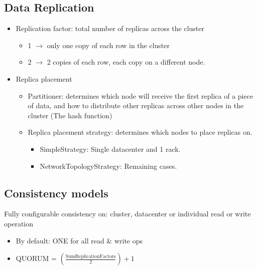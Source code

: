 \subsection{Data Replication}
\begin{itemize}
  \item Replication factor: total number of replicas across the cluster
  \begin{itemize}
    \item 1 $\rightarrow$ only one copy of each row in the cluster
    \item 2 $\rightarrow$ 2 copies of each row, each copy on a different node.
  \end{itemize}
  \item Replica placement
  \begin{itemize}
    \item Partitioner: determines which node will receive the first replica of a piece of data, and how to distribute other replicas across other nodes in the cluster (The hash function)
    \item Replica placement strategy: determines which nodes to place replicas on.
    \begin{itemize}
      \item SimpleStrategy: Single datacenter and 1 rack.
      \item NetworkTopologyStrategy: Remaining cases.
    \end{itemize}
  \end{itemize}
\end{itemize}
\subsection{Consistency models}
 Fully configurable consistency on: cluster, datacenter or individual read or write operation
\begin{itemize}
  \item By default: ONE for all read \& write ops
  \item QUORUM = $\left(\frac{\text{SumReplicationFactors}}{2}\right) + 1$
\end{itemize}

